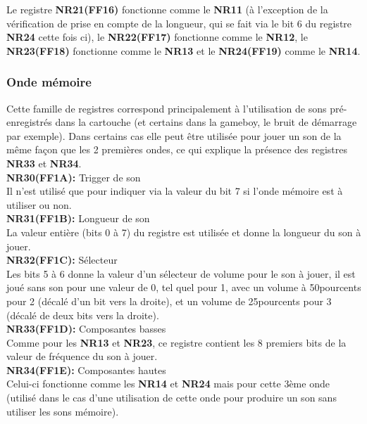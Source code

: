\documentclass{report}
\begin{document}
	Le registre \textbf{NR21(FF16)} fonctionne comme le \textbf{NR11} (à
		l'exception de la vérification de prise en compte de
		la longueur, qui se fait via le bit 6 du registre \textbf{NR24}
		cette fois ci), le \textbf{NR22(FF17)} fonctionne comme le
		\textbf{NR12}, le \textbf{NR23(FF18)} fonctionne comme le \textbf{NR13} et le
		\textbf{NR24(FF19)} comme le \textbf{NR14}. 
			
		\subsubsection{Onde mémoire}
		Cette famille de registres correspond principalement à
		l'utilisation de sons pré-enregistrés dans la cartouche
		(et certains dans la gameboy, le bruit de démarrage par
		exemple).
		Dans certains cas elle peut être utilisée pour jouer un son de
		la même façon que les 2 premières ondes, ce qui explique la
		présence des registres \textbf{NR33} et \textbf{NR34}. \\ 
		
		\textbf{NR30(FF1A):} Trigger de son \\ 
		Il n'est utilisé que pour indiquer via la
		valeur du bit 7 si l'onde mémoire est à utiliser ou
		non.\\
		
		\textbf{NR31(FF1B):} Longueur de son \\
		La valeur entière (bits 0 à 7) du
		registre est utilisée et donne la longueur du son à
		jouer.\\ 
		
		\textbf{NR32(FF1C):} Sélecteur \\
		Les bits 5 à 6 donne la valeur d'un
		sélecteur de volume pour le son à jouer, il est joué
		sans son pour une valeur de 0, tel quel pour 1, avec un volume à 50pourcents 
		pour 2 (décalé d'un bit vers la droite), et un volume
		de 25pourcents pour 3 (décalé de deux bits vers la droite). \\
		
		\textbf{NR33(FF1D):} Composantes basses \\
		Comme pour les \textbf{NR13} et \textbf{NR23}, ce registre
		contient les 8 premiers bits de la valeur de fréquence
		du son à jouer.\\

		\textbf{NR34(FF1E):} Composantes hautes \\
		Celui-ci fonctionne comme les \textbf{NR14} et \textbf{NR24} mais pour
		cette 3ème onde (utilisé dans le cas d'une utilisation
		de cette onde pour produire un son sans utiliser les
		sons mémoire). \\
\end{document}
